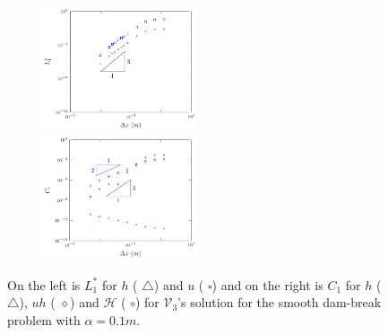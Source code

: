 \documentclass[SingleSpace,12pt,Proceedings]{Serre_ASCE}
\begin{document}
\begin{figure}
	\centering
	\begin{subfigure}{\textwidth}
		\includegraphics[width=0.5\textwidth]{pics/results/SDB/Lcon/alpha10/1.pdf}
		\includegraphics[width=0.5\textwidth]{pics/results/SDB/Con/12.pdf}
	\end{subfigure}
	\caption{On the left is $L^*_1$ for $h$ ({\color{red} $\triangle$}) and $u$ ({\color{blue} $\square$}) and on the right is $C_1$ for $h$ ({\color{red} $\triangle$}), $uh$ ({\color{black} $\diamond$}) and $\mathcal{H}$ ({\color{blue} $\circ$}) for $\mathcal{V}_3$'s solution for the smooth dam-break problem with $\alpha = 0.1m$.}
	\label{fig:o3a4dxlimmeasure}
\end{figure}



\end{document}
